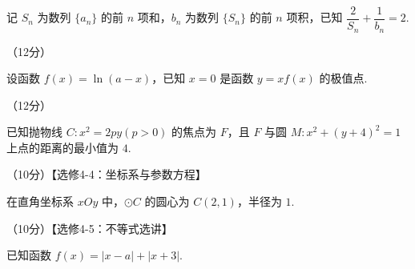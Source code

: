 \documentclass[a4paper,11pt]{report}
\begin{document}
\begin{examanswers}[start=17]
记 $S_n$ 为数列 $\{a_n\}$ 的前 $n$ 项和，$b_n$ 为数列 $\{S_n\}$ 的前 $n$ 项积，已知 $\dfrac2{S_n}+\dfrac1{b_n}=2$.



\item（12分）

设函数 $f(x)=\ln(a-x)$，已知 $x=0$ 是函数 $y=xf(x)$ 的极值点.



\item（12分）

已知抛物线 $C:x^2=2py(p>0)$ 的焦点为 $F$，且 $F$ 与圆 $M:x^2+(y+4)^2=1$ 上点的距离的最小值为 $4$.



\item（10分）【选修4-4：坐标系与参数方程】

在直角坐标系 $xOy$ 中，$\odot C$ 的圆心为 $C(2,1)$，半径为 $1$.



\item（10分）【选修4-5：不等式选讲】

已知函数 $f(x)=|x-a|+|x+3|$.



\end{examanswers}
\end{document}
